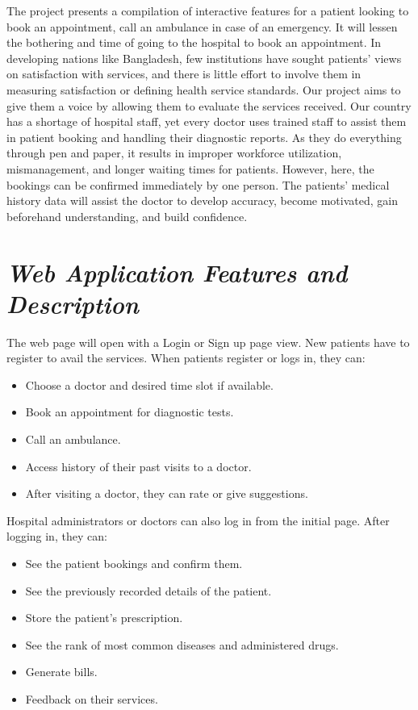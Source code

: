 \documentclass[]{article}
\begin{document}
The project presents a compilation of interactive features for a patient
looking to book an appointment, call an ambulance in case of an
emergency. It will lessen the bothering and time of going to the
hospital to book an appointment. In developing nations like Bangladesh,
few institutions have sought patients' views on satisfaction with
services, and there is little effort to involve them in measuring
satisfaction or defining health service standards. Our project aims to
give them a voice by allowing them to evaluate the services received.
Our country has a shortage of hospital staff, yet every doctor uses
trained staff to assist them in patient booking and handling their
diagnostic reports. As they do everything through pen and paper, it
results in improper workforce utilization, mismanagement, and longer
waiting times for patients. However, here, the bookings can be confirmed
immediately by one person. The patients' medical history data will
assist the doctor to develop accuracy, become motivated, gain beforehand
understanding, and build confidence.

\section{\texorpdfstring{\textbf{\emph{Web Application Features and
Description}}}{Web Application Features and Description}}\label{web-application-features-and-description}

The web page will open with a Login or Sign up page view. New patients
have to register to avail the services. When patients register or logs
in, they can:

\begin{itemize}
\item
  Choose a doctor and desired time slot if available.
\item
  Book an appointment for diagnostic tests.
\item
  Call an ambulance.
\item
  Access history of their past visits to a doctor.
\item
  After visiting a doctor, they can rate or give suggestions.
\end{itemize}

Hospital administrators or doctors can also log in from the initial
page. After logging in, they can:

\begin{itemize}
\item
  See the patient bookings and confirm them.
\item
  See the previously recorded details of the patient.
\item
  Store the patient's prescription.
\item
  See the rank of most common diseases and administered drugs.
\item
  Generate bills.
\item
  Feedback on their services.
\end{itemize}
\end{document}
